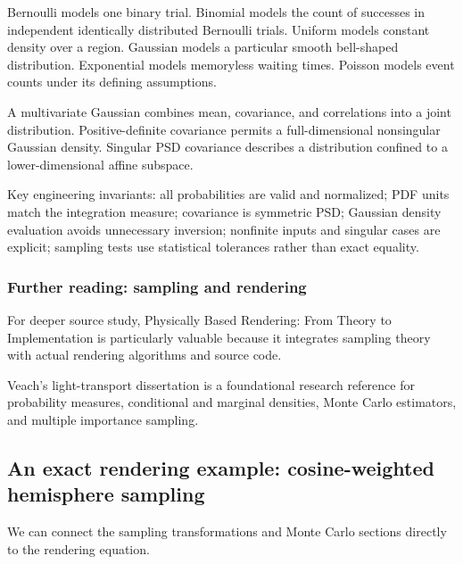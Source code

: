 Bernoulli models one binary trial. Binomial models the count of successes in independent identically distributed Bernoulli trials. Uniform models constant density over a region. Gaussian models a particular smooth bell-shaped distribution. Exponential models memoryless waiting times. Poisson models event counts under its defining assumptions.

A multivariate Gaussian combines mean, covariance, and correlations into a joint distribution. Positive-definite covariance permits a full-dimensional nonsingular Gaussian density. Singular PSD covariance describes a distribution confined to a lower-dimensional affine subspace.

Key engineering invariants: all probabilities are valid and normalized; PDF units match the integration measure; covariance is symmetric PSD; Gaussian density evaluation avoids unnecessary inversion; nonfinite inputs and singular cases are explicit; sampling tests use statistical tolerances rather than exact equality.

\subsubsection{Further reading: sampling and rendering}\label{02-foundations-ii-ch031-further-reading-sampling-and-rendering}

\hypertarget{02-foundations-ii-ch031-further-reading-sampling-and-rendering}{}

For deeper source study, Physically Based Rendering: From Theory to Implementation is particularly valuable because it integrates sampling theory with actual rendering algorithms and source code.

Veach's light-transport dissertation is a foundational research reference for probability measures, conditional and marginal densities, Monte Carlo estimators, and multiple importance sampling.

\subsection{An exact rendering example: cosine-weighted hemisphere sampling}\label{02-foundations-ii-ch031-an-exact-rendering-example-cosine-weighted-hemisphere-sampling}

\hypertarget{02-foundations-ii-ch031-an-exact-rendering-example-cosine-weighted-hemisphere-sampling}{}

We can connect the sampling transformations and Monte Carlo sections directly to the rendering equation.

